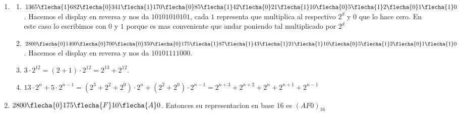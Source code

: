 \begin{enumerate}[label=(\alph*)]
  \item 
    \begin{enumerate}[label=\roman*.]
      \item 
       $1365 \flecha{1} 682 \flecha{0} 341 \flecha{1} 170 \flecha{0} 85
       \flecha{1} 42 \flecha{0} 21 \flecha{1} 10 \flecha{0} 5 \flecha{1} 2 \flecha{0} 1 \flecha{1} 0$. 
       Hacemos el display en reversa y nos da $10101010101$, cada $1$ representa que multiplica al respectivo $2^d$ y $0$ que lo hace cero. En este caso 
       lo escribimos con $0$ y $1$ porque es mas conveniente que andar poniendo tal multiplicado por $2^d$ 
       \item 
       $2800 \flecha{0} 1400 \flecha{0} 700 \flecha{0} 350 \flecha{0} 175 \flecha{1} 87 \flecha{1} 43
       \flecha{1} 21 \flecha{1} 10 \flecha{0} 5 \flecha{1} 2 \flecha{0} 1 \flecha{1} 0$. 
       Hacemos el display en reversa y nos da $10101111000$. 
       \item $3 \cdot 2^{12} = (2 + 1)\cdot 2^{12} = 2^{13} + 2^{12}$. 
       \item $13 \cdot 2^n + 5 \cdot 2^{n - 1} = (2^3 + 2^2 + 2^0) \cdot 2^n + (2^2 + 2^0) \cdot 2^{n - 1} 
       = 2^{n + 3} + 2^{n + 2} + 2^n + 2^{n + 1} + 2^{n - 1}$
      \end{enumerate}
  \item
  $2800 \flecha{0} 175 \flecha{F} 10 \flecha{A} 0$. Entonces su representacion en base $16$ es $(AF0)_{16}$
\end{enumerate}

\begin{aportes}
 \item {}
\end{aportes}

